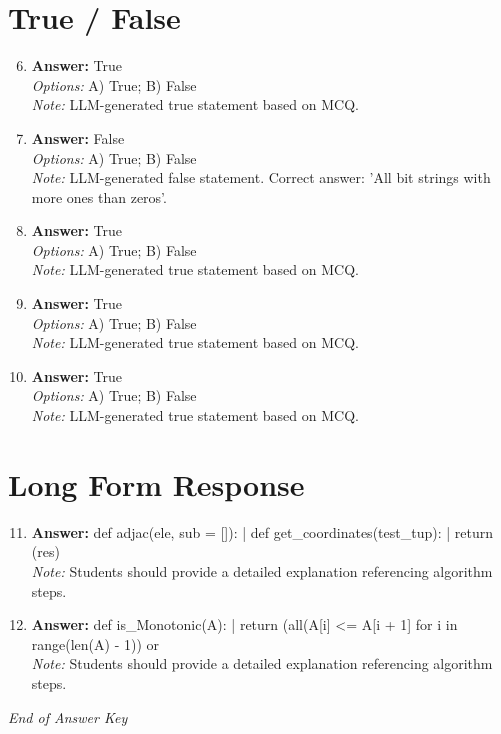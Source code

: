 \documentclass[12pt]{article}
\begin{document}
\section*{True / False}
\begin{enumerate}[label=\arabic*.]
\setcounter{enumi}{5}
\item \textbf{Answer:} True
\\ \textit{Options:} A) True; B) False
\\ \textit{Note:} LLM-generated true statement based on MCQ.
\item \textbf{Answer:} False
\\ \textit{Options:} A) True; B) False
\\ \textit{Note:} LLM-generated false statement. Correct answer: 'All bit strings with more ones than zeros'.
\item \textbf{Answer:} True
\\ \textit{Options:} A) True; B) False
\\ \textit{Note:} LLM-generated true statement based on MCQ.
\item \textbf{Answer:} True
\\ \textit{Options:} A) True; B) False
\\ \textit{Note:} LLM-generated true statement based on MCQ.
\item \textbf{Answer:} True
\\ \textit{Options:} A) True; B) False
\\ \textit{Note:} LLM-generated true statement based on MCQ.
\end{enumerate}

\section*{Long Form Response}
\begin{enumerate}[label=\arabic*.]
\setcounter{enumi}{10}
\item \textbf{Answer:} def adjac(ele, sub = []): | def get\_coordinates(test\_tup): | return (res)
\\ \textit{Note:} Students should provide a detailed explanation referencing algorithm steps.
\item \textbf{Answer:} def is\_Monotonic(A): | return (all(A[i] \textless{}= A[i + 1] for i in range(len(A) - 1)) or
\\ \textit{Note:} Students should provide a detailed explanation referencing algorithm steps.
\end{enumerate}

\vfill
\noindent\textit{End of Answer Key}
\end{document}
